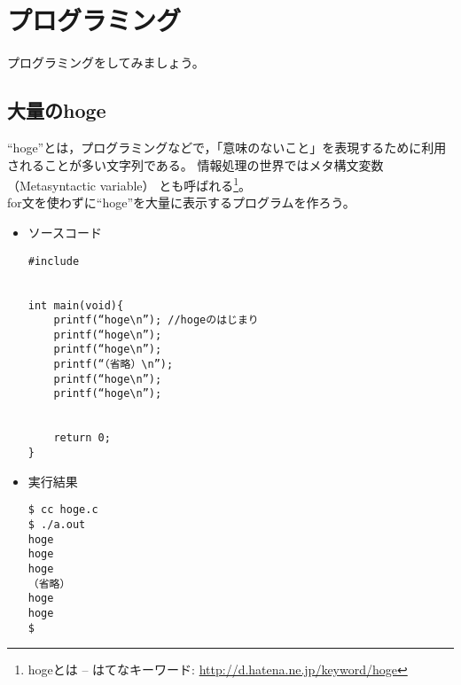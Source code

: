 \documentclass[../main]{subfiles}
\begin{document}


\section{プログラミング}
プログラミングをしてみましょう。
\subsection{大量のhoge}
“hoge”とは，プログラミングなどで，「意味のないこと」を表現するために利用されることが多い文字列である。
情報処理の世界ではメタ構文変数（Metasyntactic variable）
とも呼ばれる\footnote{hogeとは – はてなキーワード: \url{http://d.hatena.ne.jp/keyword/hoge}}。\\


for文を使わずに“hoge”を大量に表示するプログラムを作ろう。


\begin{itemize}
\item ソースコード
\begin{lstlisting}
#include 


int main(void){
    printf(“hoge\n”); //hogeのはじまり
    printf(“hoge\n”);
    printf(“hoge\n”);
    printf(“（省略）\n”);
    printf(“hoge\n”);
    printf(“hoge\n”);


    return 0;
}
\end{lstlisting}


\item 実行結果
\begin{lstlisting}
$ cc hoge.c
$ ./a.out
hoge
hoge
hoge
（省略）
hoge
hoge
$
\end{lstlisting}
\end{itemize}
\end{document}
